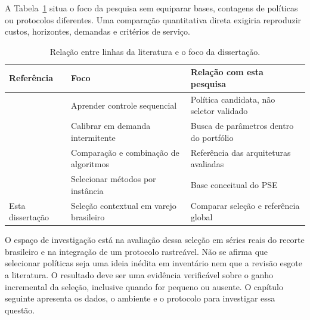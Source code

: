 A Tabela~\ref{tab:relwork_intro} situa o foco da pesquisa sem equiparar bases, contagens de políticas ou protocolos diferentes. Uma comparação quantitativa direta exigiria reproduzir custos, horizontes, demandas e critérios de serviço.

\begin{table}[htb]
\centering\small
\caption{Relação entre linhas da literatura e o foco da dissertação.}
\label{tab:relwork_intro}
\begin{tabular}{@{}p{4.2cm}p{4.4cm}p{4.5cm}@{}}
\toprule
Referência & Foco & Relação com esta pesquisa\\
\midrule
\citealt{Oroojlooyjadid2022BeerGameDQN} & Aprender controle sequencial & Política candidata, não seletor validado\\
\citealt{Yuna2023IntermittentMetaheuristics} & Calibrar em demanda intermitente & Busca de parâmetros dentro do portfólio\\
\citealt{Zabraoui2025GaDQN} & Comparação e combinação de algoritmos & Referência das arquiteturas avaliadas\\
\citealt{Rice1976AlgorithmSelection,Kotthoff2014AlgorithmSelection} & Selecionar métodos por instância & Base conceitual do PSE\\
Esta dissertação & Seleção contextual em varejo brasileiro & Comparar seleção e referência global\\
\bottomrule
\end{tabular}
\end{table}

O espaço de investigação está na avaliação dessa seleção em séries reais do recorte brasileiro e na integração de um protocolo rastreável. Não se afirma que selecionar políticas seja uma ideia inédita em inventário nem que a revisão esgote a literatura. O resultado deve ser uma evidência verificável sobre o ganho incremental da seleção, inclusive quando for pequeno ou ausente. O capítulo seguinte apresenta os dados, o ambiente e o protocolo para investigar essa questão.
